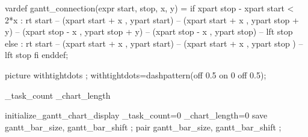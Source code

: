 

\unprotect


\startMPinitializations
  vardef gantt_connection(expr start, stop, x, y) = 
    if xpart stop - xpart start < 2*x :
      rt start -- 
      (xpart start + x , ypart start) -- 
      (xpart start + x , ypart stop + y) -- 
      (xpart stop - x  , ypart stop + y) -- 
      (xpart stop - x  , ypart stop) -- 
      lft stop 
    else :
      rt start -- 
      (xpart start + x , ypart start) -- 
      (xpart start + x , ypart stop ) -- 
      lft stop 
    fi 
  enddef;

  picture withtightdots ;
  withtightdots=dashpattern(off 0.5 on 0 off 0.5); %
\stopMPinitializations

\newcount\gantt_task_count
\newcount\gantt_chart_length

\starttexdefinition initialize_gantt_chart_display
   \gantt_task_count=0
   \gantt_chart_length=0
   \resetMPdrawing
   \startMPdrawing
     save gantt_bar_size, gantt_bar_shift ;
     pair gantt_bar_size, gantt_bar_shift ;
      
